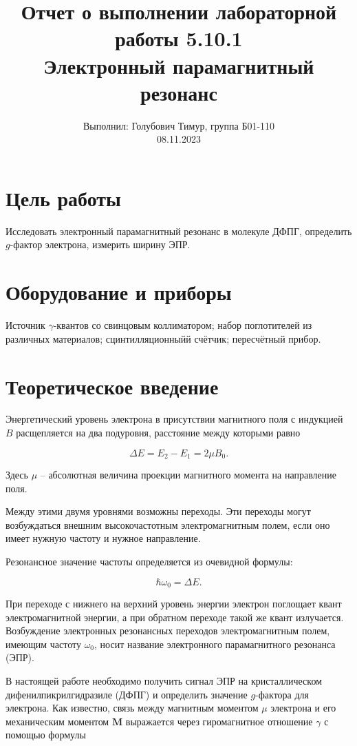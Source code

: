 \documentclass[12pt,a4paper]{article}
\author{\normalsize Выполнил: Голубович Тимур, группа Б01-110 \\
    	\normalsize 08.11.2023}
\date{}
\title{
    	\large Отчет о выполнении лабораторной работы 5.10.1 \\
    	\Large Электронный парамагнитный резонанс
     }
\begin{document}
\maketitle

\section*{Цель работы}

Исследовать электронный парамагнитный резонанс в молекуле ДФПГ, определить $g$-фактор электрона, измерить ширину ЭПР.


\section*{Оборудование и приборы}

Источник  $\gamma$-квантов со свинцовым коллиматором; набор поглотителей из различных материалов; сцинтилляционныйй счётчик; пересчётный прибор.
	
\section*{Теоретическое введение}

Энергетический уровень электрона в присутствии магнитного поля с индукцией $B$ расщепляется на два подуровня, расстояние между которыми равно 

\[	\Delta E = E_2 - E_1 = 2\mu B_0.\]
    
Здесь $\mu$ -- абсолютная величина проекции магнитного момента на направление поля.

Между этими двумя уровнями возможны переходы. Эти переходы могут возбуждаться внешним высокочастотным электромагнитным полем, если оно имеет нужную частоту и нужное направление.

Резонансное значение частоты определяется из очевидной формулы:

\[	\hbar \omega_0 = \Delta E.\]

При переходе с нижнего на верхний уровень энергии электрон поглощает квант электромагнитной энергии, а при обратном переходе такой же квант излучается. Возбуждение электронных резонансных переходов электромагнитным полем, имеющим частоту $\omega_0$, носит название электронного парамагнитного резонанса (ЭПР).

В настоящей работе необходимо получить сигнал ЭПР на кристаллическом дифенилпикрилгидразиле (ДФПГ) и определить значение $g$-фактора для электрона. Как известно, связь между магнитным моментом $\mu$ электрона и его механическим моментом $\mathbf{M}$ выражается через гиромагнитное отношение $\gamma$ с помощью формулы
\end{document}
